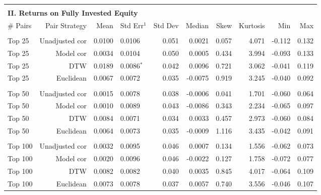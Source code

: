 \documentclass[12pt]{article}
\begin{document}
\begin{table}[hp]
\begin{tabular}{l r r l r r r r r r}
        \vspace{-1mm} \\
        \hline
        \vspace{1 mm} \\
        \multicolumn{9}{l}{\textbf{II. Returns on Fully Invested Equity}} \\
        \# Pairs  & Pair Strategy & Mean & Std Err{$^{1}$} & Std Dev & Median & Skew & Kurtosis & Min & Max \\
        \hline
        \vspace{-1mm} \\
        Top 25    & Unadjusted cor &  0.0100 & 0.0106          & 0.051 &  0.0021 &  0.057 & 4.071 & -0.112 & 0.132 \\
        Top 25    & Model cor      &  0.0034 & 0.0104          & 0.050 &  0.0005 &  0.434 & 3.994 & -0.093 & 0.133 \\
        Top 25    & DTW            &  0.0189 & 0.0086{$^{*}$}  & 0.042 &  0.0096 &  0.721 & 3.062 & -0.041 & 0.119 \\
        Top 25    & Euclidean      &  0.0067 & 0.0072          & 0.035 & -0.0075 &  0.919 & 3.245 & -0.040 & 0.092 \\
        \vspace{-1mm} \\
        Top 50    & Unadjusted cor &  0.0015 & 0.0078          & 0.038 & -0.0006 &  0.041 & 1.701 & -0.060 & 0.064 \\
        Top 50    & Model cor      &  0.0010 & 0.0089          & 0.043 & -0.0086 &  0.343 & 2.234 & -0.065 & 0.097 \\
        Top 50    & DTW            &  0.0084 & 0.0071          & 0.034 &  0.0033 &  0.457 & 2.973 & -0.060 & 0.084 \\
        Top 50    & Euclidean      &  0.0064 & 0.0073          & 0.035 & -0.0009 &  1.116 & 3.435 & -0.042 & 0.091 \\
        \vspace{-1mm} \\
        Top 100   & Unadjusted cor &  0.0032 & 0.0095          & 0.046 &  0.0007 &  0.134 & 1.556 & -0.062 & 0.073 \\
        Top 100   & Model cor      &  0.0020 & 0.0096          & 0.046 & -0.0022 &  0.127 & 1.758 & -0.072 & 0.077 \\
        Top 100   & DTW            &  0.0082 & 0.0082          & 0.040 &  0.0035 &  0.845 & 4.017 & -0.064 & 0.109 \\
        Top 100   & Euclidean      &  0.0073 & 0.0078          & 0.037 &  0.0057 &  0.740 & 3.556 & -0.046 & 0.107 \\

\end{tabular}
\end{table}
\end{document}
